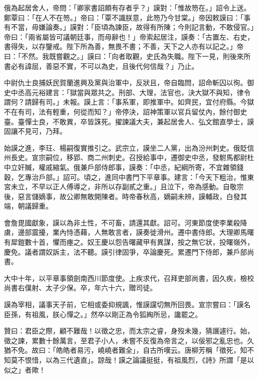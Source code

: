 \begin{pinyinscope}
 俄為起居舍人，帝問：「卿家書詔頗有存者乎？」謨對：「惟故笏在。」詔令上送。鄭覃曰：「在人不在笏。」帝曰：「覃不識朕意，此笏乃今甘棠。」帝因敕謨曰：「事有不當，毋嫌論奏。」謨對：「臣頃為諫臣，故得有所陳；今則記言動，不敢侵官。」帝曰：「兩省屬皆可議朝廷事，而毋辭也！」帝索起居注，謨奏：「古置左、右史，書得失，以存鑒戒。陛下所為善，無畏不書；不善，天下之人亦有以記之。」帝曰：「不然。我既嘗觀之。」謨曰：「向者取觀，史氏為失職。陛下一見，則後來所書必有諱屈，善惡不實，不可以為史，且後代何信哉？」乃止。



 中尉仇士良捕妖民賀蘭進興及黨與治軍中，反狀且，帝自臨問，詔命斬囚以徇。御史中丞高元裕建言：「獄當與眾共之。刑部、大理，法官也，決大獄不與知，律令謂何？請歸有司。」未報。謨上言：「事系軍，即推軍中。如齊民，宜付府縣。今獄不在有司，法有輕重，何從而知？」帝停決，詔神策軍以官兵留仗內，餘付御史臺。臺憚士良，不敢異，卒皆誅死。擢諫議大夫，兼起居舍人、弘文館直學士，謨固讓不見可，乃拜。



 始謨之進，李玨、楊嗣復實推引之。武宗立，謨坐二人黨，出為汾州刺史。俄貶信州長史。宣宗嗣位，移郢、商二州刺史。召授給事中，遷御史中丞，發駙馬都尉杜中立奸贓，權戚縮氣。俄兼戶部侍郎事，謨奏：「中丞，紀綱所寄，不宜雜領錢穀，乞專治戶部。」詔可。頃之，進同中書門下平章事。建言：「今天下粗治，惟東宮未立，不早以正人傅導之，非所以存副貳之重。」且泣下，帝為感動。自敬宗後，惡言儲嫡事，故公卿無敢開陳者。時帝春秋高，嫡嗣未辨，謨輔政，白發其端，朝議歸重。



 會詹毘國獻象，謨以為非土性，不可畜，請還其獻。詔可。河東節度使李業殺降虜，邊部震擾，業內恃憑藉，人無敢言者，謨奏徙滑州。遷中書侍郎。大理卿馬曙有犀鎧數十首，懼而瘞之。奴王慶以怨告曙藏甲有異謀，按之無它狀，投曙嶺外，慶免。議者謂奴訴主，法不聽。謨引律固爭，卒論慶死。累遷門下侍郎，兼戶部尚書。



 大中十年，以平章事領劍南西川節度使。上疾求代，召拜吏部尚書，因久疾，檢校尚書右僕射、太子少保。卒，年六十六，贈司徒。



 謨為宰相，議事天子前，它相或委抑規諷，惟謨讜切無所回畏。宣宗嘗曰：「謨名臣孫，有祖風，朕心憚之。」然卒以剛正為令狐綯所忌，讒罷之。



 贊曰：君臣之際，顧不難哉！以徵之忠，而太宗之睿，身歿未幾，猜譖遽行。始，徵之諫，累數十餘萬言，至君子小人，未嘗不反復為帝言之，以佞邪之亂忠也。久猶不免。故曰：「皓皓者易污，嶢嶢者難全」，自古所嘆云。唐柳芳稱「徵死，知不知莫不恨惜，以為三代遺直」。諒哉！謨之論議挺挺，有祖風烈，《詩》所謂「是以似之」者歟！



\end{pinyinscope}
